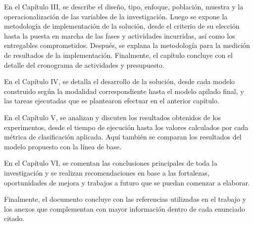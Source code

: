 En el Capítulo III, se describe el diseño, tipo, enfoque, población, muestra y la operacionalización de las variables de la investigación. Luego se expone la metodología de implementación de la solución, desde el criterio de su elección hasta la puesta en marcha de las fases y actividades incurridas, así como los entregables comprometidos. Después, se explana la metodología para la medición de resultados de la implementación. Finalmente, el capítulo concluye con el detalle del cronograma de actividades y presupuesto.

En el Capítulo IV, se detalla el desarrollo de la solución, desde cada modelo construido según la modalidad correspondiente hasta el modelo apilado final, y las tareas ejecutadas que se plantearon efectuar en el anterior capítulo.

En el Capítulo V, se analizan y discuten los resultados obtenidos de los experimentos, desde el tiempo de ejecución hasta los valores calculados por cada métrica de clasificación aplicada. Aquí también se comparan los resultados del modelo propuesto con la línea de base.

En el Capítulo VI, se comentan las conclusiones principales de toda la investigación y se realizan recomendaciones en base a las fortalezas, oportunidades de mejora y trabajos a futuro que se puedan comenzar a elaborar.

Finalmente, el documento concluye con las referencias utilizadas en el trabajo y los anexos que complementan con mayor información dentro de cada enunciado citado.
